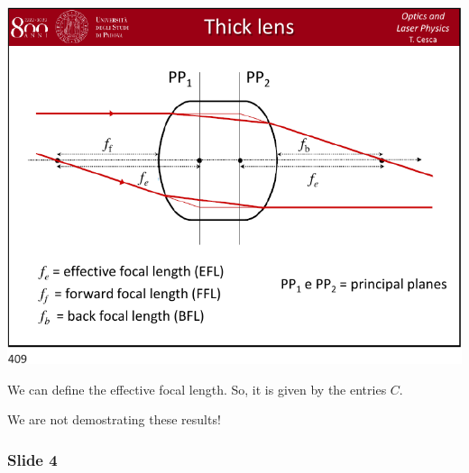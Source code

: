 \documentclass[../main/main.tex]{subfiles}
\begin{document}
\begin{minipage}[]{0.5\linewidth}
\centering
\includegraphics[page=3,width=1\textwidth]{../lessons/pdf_file/20_lecture.pdf}
\end{minipage}
\hspace{0.3cm}\vspace{0.3cm}
\begin{minipage}[c]{0.47\linewidth}

We can define the effective focal length. So, it is given by the entries \( C \).

We are not demostrating these results!

\end{minipage}

\newpage

\subsubsection*{Slide 4}
\end{document}
